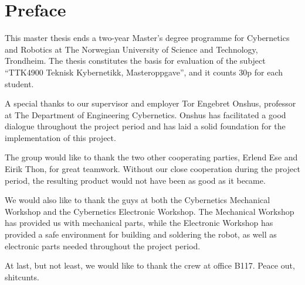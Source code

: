 \chapter*{Preface}

This master thesis ends a two-year Master's degree programme for Cybernetics and Robotics at The Norwegian University of Science and Technology, Trondheim. The thesis constitutes the basis for evaluation of the subject ``TTK4900 Teknisk Kybernetikk, Masteroppgave'', and it counts 30p for each student.

A special thanks to our supervisor and employer Tor Engebret Onshus, professor at The Department of Engineering Cybernetics. Onshus has facilitated a good dialogue throughout the project period and has laid a solid foundation for the implementation of this project.

The group would like to thank the two other cooperating parties, Erlend Ese and Eirik Thon, for great teamwork. Without our close cooperation during the project period, the resulting product would not have been as good as it became.

We would also like to thank the guys at both the Cybernetics Mechanical Workshop and the Cybernetics Electronic Workshop. The Mechanical Workshop has provided us with mechanical parts, while the Electronic Workshop has provided a safe environment for building and soldering the robot, as well as electronic parts needed throughout the project period.

At last, but not least, we would like to thank the crew at office B117. Peace out, shitcunts. 